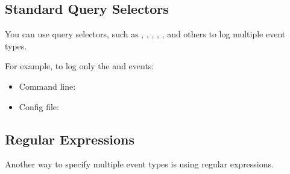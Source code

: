 \documentclass[letterpaper,10pt,english]{sphinxmanual}
\begin{document}
\subsection{Standard Query Selectors}
\label{\detokenize{audit-logging:standard-query-selectors}}
\sphinxAtStartPar
You can use query selectors,
such as , , , , , and others
to log multiple event types.

\sphinxAtStartPar
For example, to log only the  and  events:
\begin{itemize}
\item {} 
\sphinxAtStartPar
Command line:

\begin{sphinxVerbatim}[commandchars=\\\{\}]
   \PYG{l+s+s1}{ \PYGZdl{}in: [ }\PYG{l+s+s1}{ ] \PYGZcb{} \PYGZcb{}}
\end{sphinxVerbatim}

\item {} 
\sphinxAtStartPar
Config file:

\begin{sphinxVerbatim}[commandchars=\\\{\}]
   
   \PYG{l+s+s1}{ \PYGZdl{}in: [ }\PYG{l+s+s1}{ ] \PYGZcb{} \PYGZcb{}}
\end{sphinxVerbatim}

\end{itemize}


\subsection{Regular Expressions}
\label{\detokenize{audit-logging:regular-expressions}}
\sphinxAtStartPar
Another way to specify multiple event types is using regular expressions.
\end{document}
